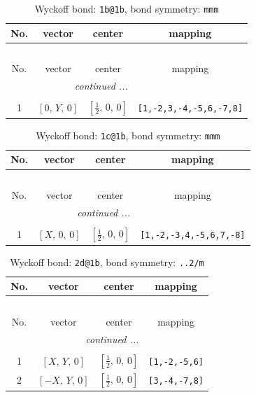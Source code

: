 \documentclass[fleqn,8pt]{jsarticle}
\begin{document}
\begin{longtable}{cccc}
\caption{Wyckoff bond: {\tt 1b@1b}, bond symmetry: {\tt mmm}}
 \\
 \hline \hline
No. & vector & center & mapping \\ \hline \endfirsthead

\multicolumn{3}{l}{\tablename\ \thetable{}} \\
 \hline \hline
No. & vector & center & mapping \\ \hline \endhead

 \hline \hline
\multicolumn{3}{r}{\footnotesize\it continued ...} \\ \endfoot

 \hline \hline
\multicolumn{3}{r}{} \\ \endlastfoot

1 & $\left[ 0,\, Y,\, 0 \right]$ & $\left[ \frac{1}{2},\, 0,\, 0 \right]$ & {\tt [1,-2,3,-4,-5,6,-7,8]} \\
\end{longtable}
\renewcommand{\arraystretch}{1.2}
\begin{longtable}{cccc}
\caption{Wyckoff bond: {\tt 1c@1b}, bond symmetry: {\tt mmm}}
 \\
 \hline \hline
No. & vector & center & mapping \\ \hline \endfirsthead

\multicolumn{3}{l}{\tablename\ \thetable{}} \\
 \hline \hline
No. & vector & center & mapping \\ \hline \endhead

 \hline \hline
\multicolumn{3}{r}{\footnotesize\it continued ...} \\ \endfoot

 \hline \hline
\multicolumn{3}{r}{} \\ \endlastfoot

1 & $\left[ X,\, 0,\, 0 \right]$ & $\left[ \frac{1}{2},\, 0,\, 0 \right]$ & {\tt [1,-2,-3,4,-5,6,7,-8]} \\
\end{longtable}
\renewcommand{\arraystretch}{1.2}
\begin{longtable}{cccc}
\caption{Wyckoff bond: {\tt 2d@1b}, bond symmetry: {\tt ..2/m}}
 \\
 \hline \hline
No. & vector & center & mapping \\ \hline \endfirsthead

\multicolumn{3}{l}{\tablename\ \thetable{}} \\
 \hline \hline
No. & vector & center & mapping \\ \hline \endhead

 \hline \hline
\multicolumn{3}{r}{\footnotesize\it continued ...} \\ \endfoot

 \hline \hline
\multicolumn{3}{r}{} \\ \endlastfoot

1 & $\left[ X,\, Y,\, 0 \right]$ & $\left[ \frac{1}{2},\, 0,\, 0 \right]$ & {\tt [1,-2,-5,6]} \\ \hline
2 & $\left[ - X,\, Y,\, 0 \right]$ & $\left[ \frac{1}{2},\, 0,\, 0 \right]$ & {\tt [3,-4,-7,8]} \\
\end{longtable}
\end{document}
